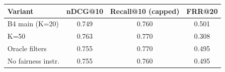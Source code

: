 \begin{tabular}{lccc}
\toprule
Variant & nDCG@10 & Recall@10 (capped) & FRR@20 \\
\midrule
B4 main (K=20) & 0.749 & 0.760 & 0.501 \\
K=50 & 0.763 & 0.770 & 0.308 \\
Oracle filters & 0.755 & 0.770 & 0.495 \\
No fairness instr. & 0.755 & 0.760 & 0.495 \\
\bottomrule
\end{tabular}
